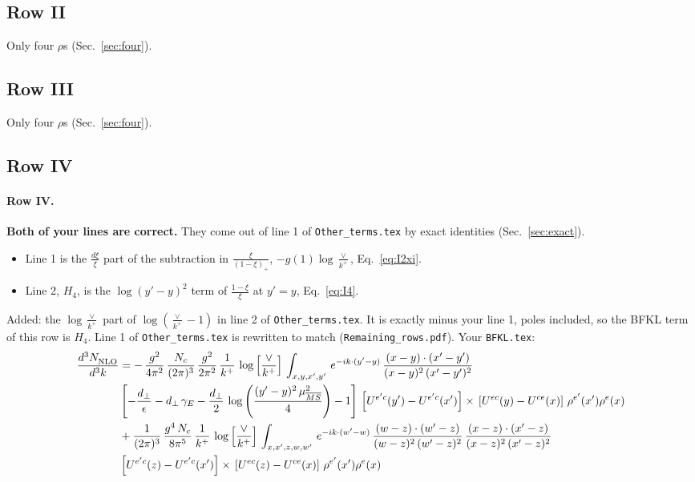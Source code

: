 \documentclass[10pt]{article}
\numberwithin{equation}{section}
\newcommand{\new}[1]{{\color{blue}#1}}
\begin{document}
\subsection{Row II}
Only four $\rho$\textquotesingle s (Sec.~\ref{sec:four}).
\subsection{Row III}
Only four $\rho$\textquotesingle s (Sec.~\ref{sec:four}).
\subsection{Row IV}
\paragraph{Row IV.}
\textbf{Both of your lines are correct.} They come out of line 1 of \texttt{Other\_terms.tex} by exact identities (Sec.~\ref{sec:exact}).
\begin{itemize}
\item Line 1 is the $\frac{d\xi}{\xi}$ part of the subtraction in $\frac{\xi}{(1-\xi)_+}$, $-g(1)\log\frac{\vee}{k^+}$, Eq.~\eqref{eq:I2xi}.
\item Line 2, $H_4$, is the $\log(y'-y)^2$ term of $\frac{1-\xi}{\xi}$ at $y'=y$, Eq.~\eqref{eq:I4}.
\end{itemize}
\new{Added}: the $\log\frac{\vee}{k^+}$ part of $\log(\frac{\vee}{k^+}-1)$ in line 2 of \texttt{Other\_terms.tex}. It is exactly minus your line 1, poles included, so the BFKL term of this row is $H_4$. Line 1 of \texttt{Other\_terms.tex} is rewritten to match (\texttt{Remaining\_rows.pdf}).
\noindent Your \texttt{BFKL.tex}:
\begin{align}
\frac{d^{3}N_{\rm NLO}^{\rm}}{d^{3}k}  & =  -\,\frac{g^{2}}{4\pi^{2}}\, \frac{N_{c}}{(2\pi)^{3}}\,\frac{g^{2}}{2\pi^{2}}\, \frac{1}{k^{+}}\,\log{\left[\frac{\vee}{k^{+}}\right]}\,\int_{x,y,x',y'}\,e^{-ik\cdot (y'-y)}\,\frac{(x-y)\cdot (x'-y')}{(x-y)^{2}\,(x'-y')^{2}}\notag \\
& \left[-\frac{d_{\perp}}{\epsilon}-d_{\perp}\,\gamma_{E}-\frac{d_{\perp}}{2}\,\log{\left(\frac{(y'-y)^{2}\,\mu^{2}_{\overline{MS}}}{4}\right)}-1\right]\,\left[U^{e'c}(y') - U^{e'c}(x')\right] \times\, \left[U^{ec}(y) - U^{ce}(x)\right]\, \rho^{e'}(x') \rho^{e}(x) \notag \\
& +\frac{1}{(2\pi)^{3}}\,\frac{g^{4}\,N_{c}}{8\pi^{5}}\,\frac{1}{k^{+}}\,\log{\left[\frac{\vee}{k^{+}}\right]}\,\int_{x,x',z,w,w'}\,e^{-ik\cdot (w'-w)}\,\frac{(w-z)\cdot(w'-z)}{(w-z)^{2}\,(w'-z)^{2}}\,\frac{(x-z)\cdot(x'-z)}{(x-z)^{2}\,(x'-z)^{2}}\notag \\
& \left[U^{e'c}(z) - U^{e'c}(x')\right] \times\, \left[U^{ec}(z) - U^{ce}(x)\right]\, \rho^{e'}(x') \rho^{e}(x) \label{eq:Byour:G2IV}
\end{align}
\end{document}
